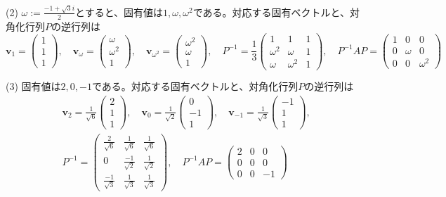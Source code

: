 \noindent (2) $\omega := \frac{-1 + \sqrt{3}i}{2}$とすると、固有値は$1, \omega, \omega^2$である。対応する固有ベクトルと、対角化行列$P$の逆行列は
\[
\bm{v}_1 = 
\begin{pmatrix}
1 \\
1 \\
1
\end{pmatrix}, \quad
\bm{v}_{\omega} = 
\begin{pmatrix}
\omega \\
\omega^2 \\
1
\end{pmatrix}, \quad
\bm{v}_{\omega^2} = 
\begin{pmatrix}
\omega^2 \\
\omega \\
1
\end{pmatrix}, \quad
P^{-1} = 
\frac{1}{3}
\begin{pmatrix}
1 & 1 & 1 \\
\omega^2 & \omega & 1 \\
\omega & \omega^2 & 1
\end{pmatrix}, \quad
P^{-1} AP =
\begin{pmatrix}
1 & 0 & 0 \\
0 & \omega & 0 \\
0 & 0 & \omega^2
\end{pmatrix}
\]

\noindent (3) 固有値は$2, 0, -1$である。対応する固有ベクトルと、対角化行列$P$の逆行列は
\begin{align*}
& \bm{v}_2 = 
\frac{1}{\sqrt{6}}
\begin{pmatrix}
2 \\
1 \\
1
\end{pmatrix}, \quad
\bm{v}_0 = 
\frac{1}{\sqrt{2}}
\begin{pmatrix}
0 \\
-1 \\
1
\end{pmatrix}, \quad
\bm{v}_{-1} = 
\frac{1}{\sqrt{3}}
\begin{pmatrix}
-1 \\
1 \\
1
\end{pmatrix}, \\
& P^{-1} = 
\begin{pmatrix}
\frac{2}{\sqrt{6}} & \frac{1}{\sqrt{6}} & \frac{1}{\sqrt{6}} \\
0 & \frac{-1}{\sqrt{2}} & \frac{1}{\sqrt{2}} \\
\frac{-1}{\sqrt{3}} & \frac{1}{\sqrt{3}} & \frac{1}{\sqrt{3}}
\end{pmatrix}, \quad
P^{-1} AP =
\begin{pmatrix}
2 & 0 & 0 \\
0 & 0 & 0 \\
0 & 0 & -1
\end{pmatrix}
\end{align*}

